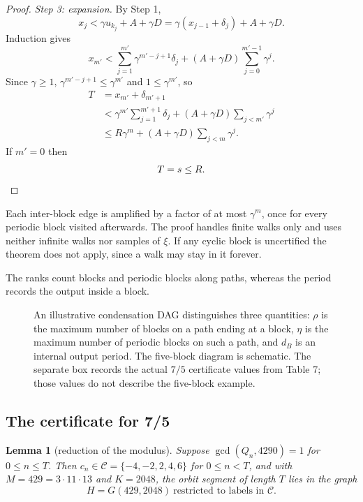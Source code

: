 \documentclass[11pt,reqno]{amsart}
\newtheorem{lemma}[theorem]{Lemma}
\theoremstyle{definition}
\theoremstyle{remark}
\begin{document}
\begin{proof}
\emph{Step 3: expansion.} By Step 1,
\[
x_j<\gamma u_{k_j}+A+\gamma D=\gamma(x_{j-1}+\delta_j)+A+\gamma D.
\]
Induction gives
\[
x_{m'}<\sum_{j=1}^{m'}\gamma^{m'-j+1}\delta_j+(A+\gamma D)\sum_{j=0}^{m'-1}\gamma^j .
\]
Since \(\gamma\ge1\), \(\gamma^{m'-j+1}\le\gamma^{m'}\) and
\(1\le\gamma^{m'}\), so
\[
\begin{aligned}
T&=x_{m'}+\delta_{m'+1}\\
&<\gamma^{m'}\sum_{j=1}^{m'+1}\delta_j+(A+\gamma D)\sum_{j<m'}\gamma^j\\
&\le R\gamma^{m}+(A+\gamma D)\sum_{j<m}\gamma^j .
\end{aligned}
\]
If \(m'=0\) then
\[
T=s\le R.\qedhere
\]
\end{proof}

Each inter-block edge is amplified by a factor of at most \(\gamma^m\),
once for every periodic block visited afterwards. The proof handles
finite walks only and uses neither infinite walks nor samples of
\(\xi\). If any cyclic block is uncertified the theorem does not apply,
since a walk may stay in it forever.

The ranks count blocks and periodic blocks along paths, whereas the period records the output inside a block.

\begin{figure}[htbp]
\centering

\caption{An illustrative condensation DAG distinguishes three quantities: \(\rho\) is the maximum number of blocks on a path ending at a block, \(\eta\) is the maximum number of periodic blocks on such a path, and \(d_B\) is an internal output period. The five-block diagram is schematic. The separate box records the actual \(7/5\) certificate values from Table 7; those values do not describe the five-block example.}
\label{fig:rank-certificate}
\end{figure}

\subsection{The certificate for 7/5}\label{sec:6.3}

\begin{samepage}
\begin{lemma}[reduction of the modulus]\leavevmode\label{thm:28}
Suppose \(\gcd(Q_n,4290)=1\)
for \(0\le n\le T\). Then \(c_n\in\mathcal C=\{-4,-2,2,4,6\}\) for
\(0\le n<T\), and with \(M=429=3\cdot11\cdot13\) and \(K=2048\), the
orbit segment of length \(T\) lies in the graph
\[
H=G(429,2048)\ \text{restricted to labels in }\mathcal C .
\]
\label{thm-end:28}
\end{lemma}
\end{samepage}
\end{document}
